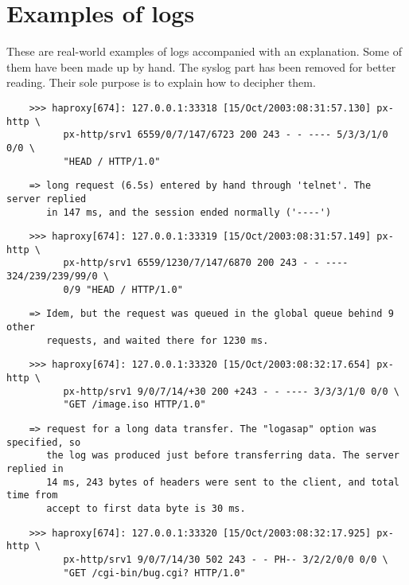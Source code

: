 
\section{Examples of logs}

These are real-world examples of logs accompanied with an explanation. Some of
them have been made up by hand. The syslog part has been removed for better
reading. Their sole purpose is to explain how to decipher them.

\begin{verbatim}
    >>> haproxy[674]: 127.0.0.1:33318 [15/Oct/2003:08:31:57.130] px-http \
          px-http/srv1 6559/0/7/147/6723 200 243 - - ---- 5/3/3/1/0 0/0 \
          "HEAD / HTTP/1.0"
\end{verbatim}

\begin{verbatim}
    => long request (6.5s) entered by hand through 'telnet'. The server replied
       in 147 ms, and the session ended normally ('----')
\end{verbatim}

\begin{verbatim}
    >>> haproxy[674]: 127.0.0.1:33319 [15/Oct/2003:08:31:57.149] px-http \
          px-http/srv1 6559/1230/7/147/6870 200 243 - - ---- 324/239/239/99/0 \
          0/9 "HEAD / HTTP/1.0"
\end{verbatim}

\begin{verbatim}
    => Idem, but the request was queued in the global queue behind 9 other
       requests, and waited there for 1230 ms.
\end{verbatim}

\begin{verbatim}
    >>> haproxy[674]: 127.0.0.1:33320 [15/Oct/2003:08:32:17.654] px-http \
          px-http/srv1 9/0/7/14/+30 200 +243 - - ---- 3/3/3/1/0 0/0 \
          "GET /image.iso HTTP/1.0"
\end{verbatim}

\begin{verbatim}
    => request for a long data transfer. The "logasap" option was specified, so
       the log was produced just before transferring data. The server replied in
       14 ms, 243 bytes of headers were sent to the client, and total time from
       accept to first data byte is 30 ms.
\end{verbatim}

\begin{verbatim}
    >>> haproxy[674]: 127.0.0.1:33320 [15/Oct/2003:08:32:17.925] px-http \
          px-http/srv1 9/0/7/14/30 502 243 - - PH-- 3/2/2/0/0 0/0 \
          "GET /cgi-bin/bug.cgi? HTTP/1.0"
\end{verbatim}

